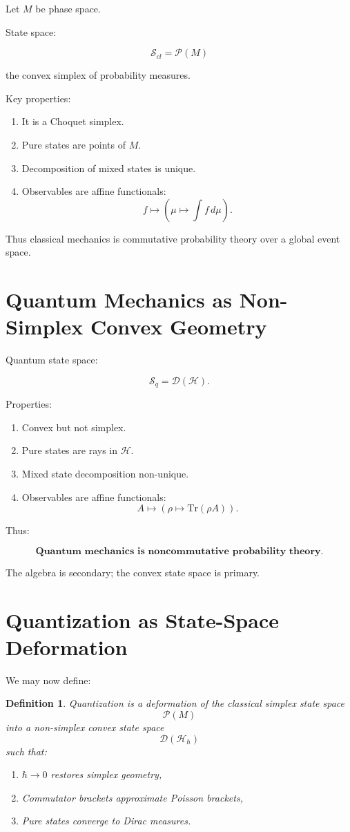 \documentclass[11pt]{book}
\newtheorem{definition}[theorem]{Definition}
\begin{document}
Let $M$ be phase space.

State space:

\[
\mathcal{S}_{cl} = \mathcal{P}(M)
\]

the convex simplex of probability measures.

Key properties:

\begin{enumerate}
\item It is a Choquet simplex.
\item Pure states are points of $M$.
\item Decomposition of mixed states is unique.
\item Observables are affine functionals:
\[
f \mapsto \left(\mu \mapsto \int f\,d\mu\right).
\]
\end{enumerate}

Thus classical mechanics is commutative probability theory over a global event space.

\section{Quantum Mechanics as Non-Simplex Convex Geometry}

Quantum state space:

\[
\mathcal{S}_q = \mathcal{D}(\mathcal{H}).
\]

Properties:

\begin{enumerate}
\item Convex but not simplex.
\item Pure states are rays in $\mathcal{H}$.
\item Mixed state decomposition non-unique.
\item Observables are affine functionals:
\[
A \mapsto (\rho \mapsto \mathrm{Tr}(\rho A)).
\]
\end{enumerate}

Thus:

\[
\textbf{Quantum mechanics is noncommutative probability theory}.
\]

The algebra is secondary; the convex state space is primary.

\section{Quantization as State-Space Deformation}

We may now define:

\begin{definition}
Quantization is a deformation of the classical simplex state space
\[
\mathcal{P}(M)
\]
into a non-simplex convex state space
\[
\mathcal{D}(\mathcal{H}_\hbar)
\]
such that:
\begin{enumerate}
\item $\hbar \to 0$ restores simplex geometry,
\item Commutator brackets approximate Poisson brackets,
\item Pure states converge to Dirac measures.
\end{enumerate}
\end{definition}
\end{document}
